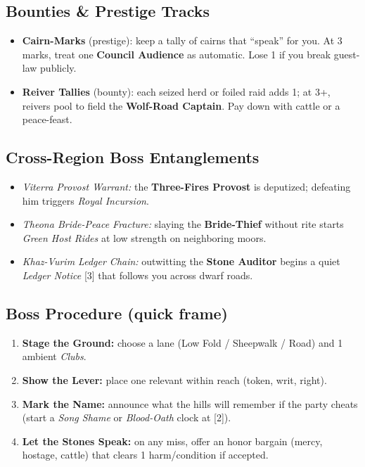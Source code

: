 \subsection*{Bounties \& Prestige Tracks}
\begin{itemize}
  \item \textbf{Cairn-Marks} (prestige): keep a tally of cairns that “speak” for you. At 3 marks, treat one \textbf{Council Audience} as automatic. Lose 1 if you break guest-law publicly.
  \item \textbf{Reiver Tallies} (bounty): each seized herd or foiled raid adds 1; at 3+, reivers pool to field the \textbf{Wolf-Road Captain}. Pay down with cattle or a peace-feast.
\end{itemize}

\subsection*{Cross-Region Boss Entanglements}
\begin{itemize}
  \item \emph{Viterra Provost Warrant:} the \textbf{Three-Fires Provost} is deputized; defeating him triggers \emph{Royal Incursion}.
  \item \emph{Theona Bride-Peace Fracture:} slaying the \textbf{Bride-Thief} without rite starts \emph{Green Host Rides} at low strength on neighboring moors.
  \item \emph{Khaz-Vurim Ledger Chain:} outwitting the \textbf{Stone Auditor} begins a quiet \emph{Ledger Notice} [3] that follows you across dwarf roads.
\end{itemize}

\subsection*{Boss Procedure (quick frame)}
\begin{enumerate}
  \item \textbf{Stage the Ground:} choose a lane (Low Fold / Sheepwalk / Road) and 1 ambient \emph{Clubs}.
  \item \textbf{Show the Lever:} place one relevant \Diamond{} within reach (token, writ, right).
  \item \textbf{Mark the Name:} announce what the hills will remember if the party cheats (start a \emph{Song Shame} or \emph{Blood-Oath} clock at [2]).
  \item \textbf{Let the Stones Speak:} on any miss, offer an honor bargain (mercy, hostage, cattle) that clears 1 harm/condition if accepted.
\end{enumerate}